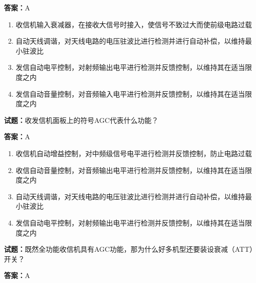 \documentclass{ctexbook}
\begin{document}
\textbf{答案：}A 

\begin{enumerate}[leftmargin=3em]
  \item 收信机输入衰减器，在接收大信号时接入，使信号不致过大而使前级电路过载 

  \item 自动天线调谐，对天线电路的电压驻波比进行检测并进行自动补偿，以维持最小驻波比 

  \item 发信自动电平控制，对射频输出电平进行检测并反馈控制，以维持其在适当限度之内 

  \item 发信自动音量控制，对音频输入电平进行检测并反馈控制，以维持其在适当限度之内 

\end{enumerate}






\vspace{1em}

\textbf{试题：}收发信机面板上的符号AGC代表什么功能？ 

\textbf{答案：}A 

\begin{enumerate}[leftmargin=3em]
  \item 收信机自动增益控制，对中频级信号电平进行检测并反馈控制，防止电路过载 

  \item 收信自动音量控制，对音频输出电平进行检测并反馈控制，以维持其在适当限度之内 

  \item 自动天线调谐，对天线电路的电压驻波比进行检测并进行自动补偿，以维持最小驻波比 

  \item 发信自动电平控制，对射频输出电平进行检测并反馈控制，以维持其在适当限度之内 

\end{enumerate}





\vspace{1em}

\textbf{试题：}既然全功能收信机具有AGC功能，那为什么好多机型还要装设衰减（ATT）开关？ 

\textbf{答案：}A 
\end{document}
